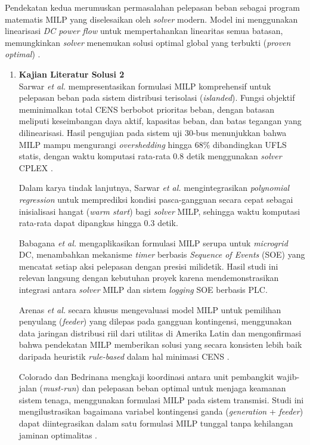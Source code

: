 Pendekatan kedua merumuskan permasalahan pelepasan beban sebagai program matematis MILP yang diselesaikan oleh \textit{solver} modern. Model ini menggunakan linearisasi \textit{DC power flow} untuk mempertahankan linearitas semua batasan, memungkinkan \textit{solver} menemukan solusi optimal global yang terbukti (\textit{proven optimal}) \cite{Sarwar2020, Sarwar2022}.

\begin{enumerate}
\item[a.] \textbf{Kajian Literatur Solusi 2} \\
Sarwar \textit{et al.} \cite{Sarwar2020} mempresentasikan formulasi MILP komprehensif untuk pelepasan beban pada sistem distribusi terisolasi (\textit{islanded}). Fungsi objektif meminimalkan total CENS berbobot prioritas beban, dengan batasan meliputi keseimbangan daya aktif, kapasitas beban, dan batas tegangan yang dilinearisasi. Hasil pengujian pada sistem uji 30-bus menunjukkan bahwa MILP mampu mengurangi \textit{overshedding} hingga 68\% dibandingkan UFLS statis, dengan waktu komputasi rata-rata 0.8 detik menggunakan \textit{solver} CPLEX \cite{Sarwar2020}.

Dalam karya tindak lanjutnya, Sarwar \textit{et al.} \cite{Sarwar2022} mengintegrasikan \textit{polynomial regression} untuk memprediksi kondisi pasca-gangguan secara cepat sebagai inisialisasi hangat (\textit{warm start}) bagi \textit{solver} MILP, sehingga waktu komputasi rata-rata dapat dipangkas hingga 0.3 detik.

Babagana \textit{et al.} \cite{Babagana2025} mengaplikasikan formulasi MILP serupa untuk \textit{microgrid} DC, menambahkan mekanisme \textit{timer} berbasis \textit{Sequence of Events} (SOE) yang mencatat setiap aksi pelepasan dengan presisi milidetik. Hasil studi ini relevan langsung dengan kebutuhan proyek karena mendemonstrasikan integrasi antara \textit{solver} MILP dan sistem \textit{logging} SOE berbasis PLC.

Arenas \textit{et al.} \cite{Arenas2026} secara khusus mengevaluasi model MILP untuk pemilihan penyulang (\textit{feeder}) yang dilepas pada gangguan kontingensi, menggunakan data jaringan distribusi riil dari utilitas di Amerika Latin dan mengonfirmasi bahwa pendekatan MILP memberikan solusi yang secara konsisten lebih baik daripada heuristik \textit{rule-based} dalam hal minimasi CENS \cite{Arenas2026}.

Colorado dan Bedrinana \cite{Colorado2018} mengkaji koordinasi antara unit pembangkit wajib-jalan (\textit{must-run}) dan pelepasan beban optimal untuk menjaga keamanan sistem tenaga, menggunakan formulasi MILP pada sistem transmisi. Studi ini mengilustrasikan bagaimana variabel kontingensi ganda (\textit{generation} + \textit{feeder}) dapat diintegrasikan dalam satu formulasi MILP tunggal tanpa kehilangan jaminan optimalitas \cite{Colorado2018}.


\end{enumerate}
